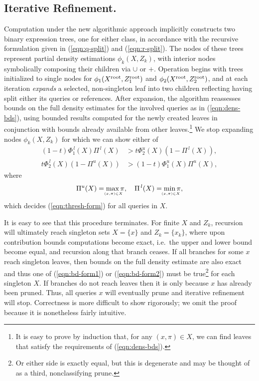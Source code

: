 \documentclass[twoside,leqno,twocolumn]{article}
\newcommand{\kdroot}[1]{#1^{\rm root}}
\newcommand{\lo}[1]{#1^{\,l}}
\newcommand{\hi}[1]{#1^u}
\newcommand{\leftlim}[1]{\lefteqn{\scriptscriptstyle #1}}
\begin{document}
\subsection{Iterative Refinement.}
Computation under the new algorithmic approach implicitly constructs
two binary expression trees, one for either class, in accordance with
the recursive formulation given in (\ref{eqn:q-split}) and
(\ref{eqn:r-split}).  The nodes of these trees represent partial
density estimations $\phi_k(X,Z_k)$, with interior nodes symbolically
composing their children via $\cup$ or $+$.  Operation begins with
trees initialized to single nodes for
$\phi_1(\kdroot{X},\kdroot{Z_1})$ and
$\phi_2(\kdroot{X},\kdroot{Z_2})$, and at each iteration {\em expands}
a selected, non-singleton leaf into two children reflecting having
split either its queries or references.  After expansion, the
algorithm reassesses bounds on the full density estimates for the
involved queries as in (\ref{eqn:dens-bds}), using bounded results
computed for the newly created leaves in conjunction with bounds
already available from other leaves.\footnote{It is easy to prove by
induction that, for any $(x,\pi) \in X$, we can find leaves that satisfy
the requirements of (\ref{eqn:dens-bds}).}  We stop expanding nodes
$\phi_k(X,Z_k)$ for which we can show either of
\begin{align}
  \label{eqn:bd-form1} (1-t)\lo{\Phi_1}(X)\lo{\Pi}(X) & > t\hi{\Phi_2}(X)(1-\lo{\Pi}(X)) , \\
  \label{eqn:bd-form2} t\lo{\Phi_2}(X)(1-\hi{\Pi}(X)) & > (1-t)\hi{\Phi_1}(X)\hi{\Pi}(X) ,
\end{align}
where
\begin{equation}
  \hi{\Pi}(X) = \max_{\leftlim{(x,\pi) \in X}} \pi , \quad \lo{\Pi}(X) = \min_{\leftlim{(x,\pi) \in X}} \pi ,
\end{equation}
which decides (\ref{eqn:thresh-form}) for all queries in $X$.

It is easy to see that this procedure terminates.  For finite $X$ and
$Z_k$, recursion will ultimately reach singleton sets $X = \{x\}$ and
$Z_k = \{x_k\}$, where upon contribution bounds computations become
exact, i.e.~the upper and lower bound become equal, and recursion
along that branch ceases.  If all branches for some $x$ reach
singleton leaves, then bounds on the full density estimate are also
exact and thus one of (\ref{eqn:bd-form1}) or (\ref{eqn:bd-form2})
must be true\footnote{Or either side is exactly equal, but this is
degenerate and may be thought of as a third, nonclassifying prune.}
for each singleton $X$.  If branches do not reach leaves then it is
only because $x$ has already been pruned.  Thus, all queries $x$ will
eventually prune and iterative refinement will stop.  Correctness is
more difficult to show rigorously; we omit the proof because it is
nonetheless fairly intuitive.
\end{document}
